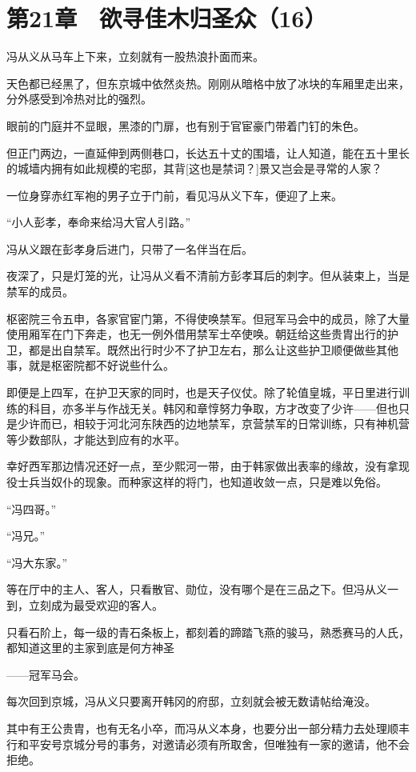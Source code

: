\section{第21章　欲寻佳木归圣众（16）}

冯从义从马车上下来，立刻就有一股热浪扑面而来。

天色都已经黑了，但东京城中依然炎热。刚刚从暗格中放了冰块的车厢里走出来，分外感受到冷热对比的强烈。

眼前的门庭并不显眼，黑漆的门扉，也有别于官宦豪门带着门钉的朱色。

但正门两边，一直延伸到两侧巷口，长达五十丈的围墙，让人知道，能在五十里长的城墙内拥有如此规模的宅邸，其背[这也是禁词？]景又岂会是寻常的人家？

一位身穿赤红军袍的男子立于门前，看见冯从义下车，便迎了上来。

“小人彭孝，奉命来给冯大官人引路。”

冯从义跟在彭孝身后进门，只带了一名伴当在后。

夜深了，只是灯笼的光，让冯从义看不清前方彭孝耳后的刺字。但从装束上，当是禁军的成员。

枢密院三令五申，各家官宦门第，不得使唤禁军。但冠军马会中的成员，除了大量使用厢军在门下奔走，也无一例外借用禁军士卒使唤。朝廷给这些贵胄出行的护卫，都是出自禁军。既然出行时少不了护卫左右，那么让这些护卫顺便做些其他事，就是枢密院都不好说些什么。

即便是上四军，在护卫天家的同时，也是天子仪仗。除了轮值皇城，平日里进行训练的科目，亦多半与作战无关。韩冈和章惇努力争取，方才改变了少许——但也只是少许而已，相较于河北河东陕西的边地禁军，京营禁军的日常训练，只有神机营等少数部队，才能达到应有的水平。

幸好西军那边情况还好一点，至少熙河一带，由于韩家做出表率的缘故，没有拿现役士兵当奴仆的现象。而种家这样的将门，也知道收敛一点，只是难以免俗。

“冯四哥。”

“冯兄。”

“冯大东家。”

等在厅中的主人、客人，只看散官、勋位，没有哪个是在三品之下。但冯从义一到，立刻成为最受欢迎的客人。

只看石阶上，每一级的青石条板上，都刻着的蹄踏飞燕的骏马，熟悉赛马的人氏，都知道这里的主家到底是何方神圣

——冠军马会。

每次回到京城，冯从义只要离开韩冈的府邸，立刻就会被无数请帖给淹没。

其中有王公贵胄，也有无名小卒，而冯从义本身，也要分出一部分精力去处理顺丰行和平安号京城分号的事务，对邀请必须有所取舍，但唯独有一家的邀请，他不会拒绝。

